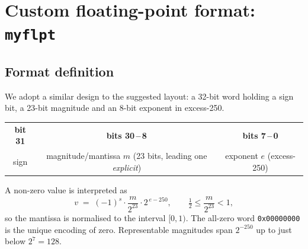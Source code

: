 \documentclass[10pt,a4paper]{article}
\begin{document}
\section{Custom floating-point format: \texttt{myflpt}}

\subsection{Format definition}

We adopt a similar design to the suggested layout: a 32-bit word holding a sign bit, a 23-bit
magnitude and an 8-bit exponent in excess-250.

\begin{center}\small
\setlength{\tabcolsep}{4pt}
\begin{tabular}{|c|c|c|}
\hline
\textbf{bit 31} & \textbf{bits 30\,--\,8} & \textbf{bits 7\,--\,0} \\
sign & magnitude/mantissa $m$ (23 bits, leading one \emph{explicit}) & exponent $e$ (excess-250) \\
\hline
\end{tabular}
\end{center}

A non-zero value is interpreted as
\begin{equation}
  v \;=\; (-1)^{s} \cdot \frac{m}{2^{23}} \cdot 2^{\,e-250},
  \qquad \tfrac{1}{2} \le \frac{m}{2^{23}} < 1 ,
\end{equation}
so the mantissa is normalised to the interval $[0, 1)$. 
The all-zero word \texttt{0x00000000} is the unique encoding of zero. Representable
magnitudes span $2^{-250}$ up to just below $2^{7} = 128$.
\end{document}

